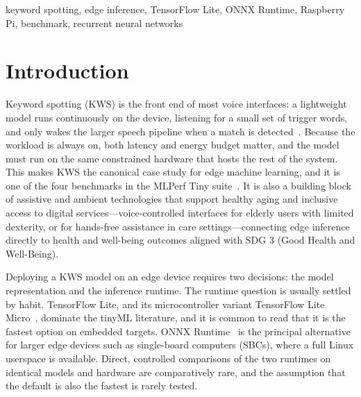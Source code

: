 \documentclass[conference,a4paper]{IEEEtran}
\begin{document}
\begin{IEEEkeywords}
keyword spotting, edge inference, TensorFlow Lite, ONNX Runtime, Raspberry Pi, benchmark, recurrent neural networks
\end{IEEEkeywords}

\section{Introduction}

Keyword spotting (KWS) is the front end of most voice interfaces: a lightweight model runs continuously on the device, listening for a small set of trigger words, and only wakes the larger speech pipeline when a match is detected~\cite{zhang2017helloedge}. Because the workload is always on, both latency and energy budget matter, and the model must run on the same constrained hardware that hosts the rest of the system. This makes KWS the canonical case study for edge machine learning, and it is one of the four benchmarks in the MLPerf Tiny suite~\cite{banbury2021mlperftiny}. It is also a building block of assistive and ambient technologies that support healthy aging and inclusive access to digital services---voice-controlled interfaces for elderly users with limited dexterity, or for hands-free assistance in care settings---connecting edge inference directly to health and well-being outcomes aligned with SDG 3 (Good Health and Well-Being).

Deploying a KWS model on an edge device requires two decisions: the model representation and the inference runtime. The runtime question is usually settled by habit. TensorFlow Lite, and its microcontroller variant TensorFlow Lite Micro~\cite{david2021tfmicro}, dominate the tinyML literature, and it is common to read that it is the fastest option on embedded targets. ONNX Runtime~\cite{onnxruntime} is the principal alternative for larger edge devices such as single-board computers (SBCs), where a full Linux userspace is available. Direct, controlled comparisons of the two runtimes on identical models and hardware are comparatively rare, and the assumption that the default is also the fastest is rarely tested.
\end{document}

